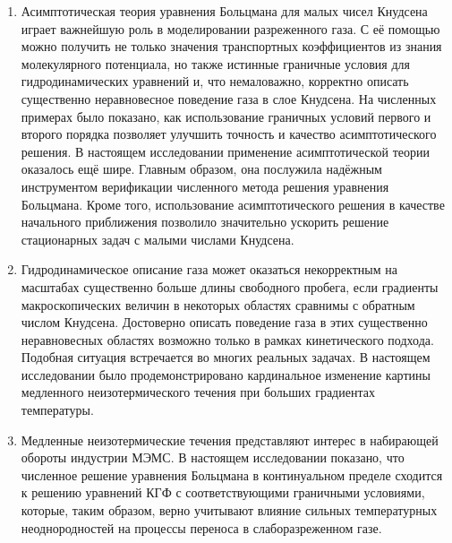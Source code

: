 \begin{enumerate}[wide]
\item Асимптотическая теория уравнения Больцмана для малых чисел Кнудсена
играет важнейшую роль в моделировании разреженного газа.
С её помощью можно получить не только значения транспортных коэффициентов из знания молекулярного потенциала,
но также истинные граничные условия для гидродинамических уравнений и, что немаловажно,
корректно описать существенно неравновесное поведение газа в слое Кнудсена.
На численных примерах было показано, как использование граничных условий первого и второго порядка
позволяет улучшить точность и качество асимптотического решения.
В настоящем исследовании применение асимптотической теории оказалось ещё шире.
Главным образом, она послужила надёжным инструментом верификации численного метода решения уравнения Больцмана.
Кроме того, использование асимптотического решения в качестве начального приближения позволило
значительно ускорить решение стационарных задач с малыми числами Кнудсена.

\item Гидродинамическое описание газа может оказаться некорректным на масштабах существенно больше длины свободного пробега,
если градиенты макроскопических величин в некоторых областях сравнимы с обратным числом Кнудсена.
Достоверно описать поведение газа в этих существенно неравновесных областях
возможно только в рамках кинетического подхода.
Подобная ситуация встречается во многих реальных задачах.
В настоящем исследовании было продемонстрировано кардинальное изменение картины
медленного неизотермического течения при больших градиентах температуры.

\item Медленные неизотермические течения представляют интерес в набирающей обороты индустрии МЭМС.
В настоящем исследовании показано, что численное решение уравнения Больцмана в континуальном пределе
сходится к решению уравнений КГФ с соответствующими граничными условиями,
которые, таким образом, верно учитывают влияние сильных температурных
неоднородностей на процессы переноса в слаборазреженном газе.

\end{enumerate}
